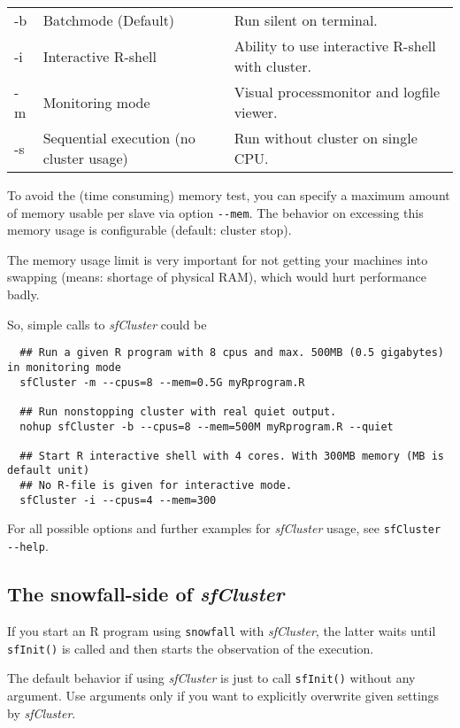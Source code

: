 \documentclass[10pt,oneside]{article}
\begin{document}
\begin{tabular}{lp{3cm}p{9cm}}
-b & Batchmode (Default) & Run silent on terminal.\\
-i & Interactive R-shell & Ability to use interactive R-shell with cluster.\\
-m & Monitoring mode & Visual processmonitor and logfile viewer.\\
-s & Sequential execution (no cluster usage) & Run without cluster on single CPU.\\
\end{tabular} 

To avoid the (time consuming) memory test, you can specify a maximum amount of
memory usable per slave via option \texttt{{-}{-}mem}. The behavior on excessing this memory
usage is configurable (default: cluster stop).

The memory usage limit is very important for not getting your machines into
swapping (means: shortage of physical RAM), which would hurt performance badly.

So, simple calls to \emph{sfCluster} could be

\begin{verbatim}
  ## Run a given R program with 8 cpus and max. 500MB (0.5 gigabytes) in monitoring mode
  sfCluster -m --cpus=8 --mem=0.5G myRprogram.R

  ## Run nonstopping cluster with real quiet output.
  nohup sfCluster -b --cpus=8 --mem=500M myRprogram.R --quiet

  ## Start R interactive shell with 4 cores. With 300MB memory (MB is default unit)
  ## No R-file is given for interactive mode.
  sfCluster -i --cpus=4 --mem=300
\end{verbatim}

For all possible options and further examples for \emph{sfCluster} usage,
see \texttt{sfCluster {-}{-}help}.

\subsection{The snowfall-side of \emph{sfCluster}}
If you start an R program using \texttt{snowfall} with \emph{sfCluster}, the latter waits
until \texttt{sfInit()} is called and then starts the observation of the execution.

The default behavior if using \emph{sfCluster} is just to call \texttt{sfInit()}
without any argument. Use arguments only if you want to explicitly overwrite
given settings by \emph{sfCluster}.
\end{document}
